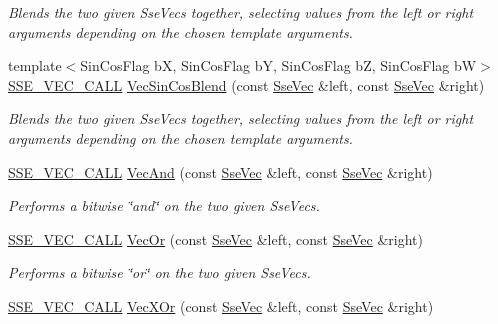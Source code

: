 \begin{DoxyCompactItemize}
\begin{DoxyCompactList}\small\item\em Blends the two given Sse\+Vecs together, selecting values from the left or right arguments depending on the chosen template arguments. \end{DoxyCompactList}\item 
{\footnotesize template$<$Sin\+Cos\+Flag b\+X, Sin\+Cos\+Flag b\+Y, Sin\+Cos\+Flag b\+Z, Sin\+Cos\+Flag b\+W$>$ }\\\hyperlink{ssevec__math__defs_8h_a97454f977a5281455cecacce1e8ba670}{S\+S\+E\+\_\+\+V\+E\+C\+\_\+\+C\+A\+L\+L} \hyperlink{group___s_i_m_d_vec_math_ga739220633256cf9a783d826ce991915d}{Vec\+Sin\+Cos\+Blend} (const \hyperlink{namespacegfxmath_a0de2243e2b8d0fd46d3af5e036423004}{Sse\+Vec} \&left, const \hyperlink{namespacegfxmath_a0de2243e2b8d0fd46d3af5e036423004}{Sse\+Vec} \&right)
\begin{DoxyCompactList}\small\item\em Blends the two given Sse\+Vecs together, selecting values from the left or right arguments depending on the chosen template arguments. \end{DoxyCompactList}\item 
\hyperlink{ssevec__math__defs_8h_a97454f977a5281455cecacce1e8ba670}{S\+S\+E\+\_\+\+V\+E\+C\+\_\+\+C\+A\+L\+L} \hyperlink{group___s_i_m_d_vec_math_ga027001ac65c982829abc16517464705e}{Vec\+And} (const \hyperlink{namespacegfxmath_a0de2243e2b8d0fd46d3af5e036423004}{Sse\+Vec} \&left, const \hyperlink{namespacegfxmath_a0de2243e2b8d0fd46d3af5e036423004}{Sse\+Vec} \&right)
\begin{DoxyCompactList}\small\item\em Performs a bitwise \char`\"{}and\char`\"{} on the two given Sse\+Vecs. \end{DoxyCompactList}\item 
\hyperlink{ssevec__math__defs_8h_a97454f977a5281455cecacce1e8ba670}{S\+S\+E\+\_\+\+V\+E\+C\+\_\+\+C\+A\+L\+L} \hyperlink{group___s_i_m_d_vec_math_gade7845a224fe159174b997a03e17f9d6}{Vec\+Or} (const \hyperlink{namespacegfxmath_a0de2243e2b8d0fd46d3af5e036423004}{Sse\+Vec} \&left, const \hyperlink{namespacegfxmath_a0de2243e2b8d0fd46d3af5e036423004}{Sse\+Vec} \&right)
\begin{DoxyCompactList}\small\item\em Performs a bitwise \char`\"{}or\char`\"{} on the two given Sse\+Vecs. \end{DoxyCompactList}\item 
\hyperlink{ssevec__math__defs_8h_a97454f977a5281455cecacce1e8ba670}{S\+S\+E\+\_\+\+V\+E\+C\+\_\+\+C\+A\+L\+L} \hyperlink{group___s_i_m_d_vec_math_ga70ec37b7265f71dba48c5c24721bcd6b}{Vec\+X\+Or} (const \hyperlink{namespacegfxmath_a0de2243e2b8d0fd46d3af5e036423004}{Sse\+Vec} \&left, const \hyperlink{namespacegfxmath_a0de2243e2b8d0fd46d3af5e036423004}{Sse\+Vec} \&right)

\end{DoxyCompactItemize}
